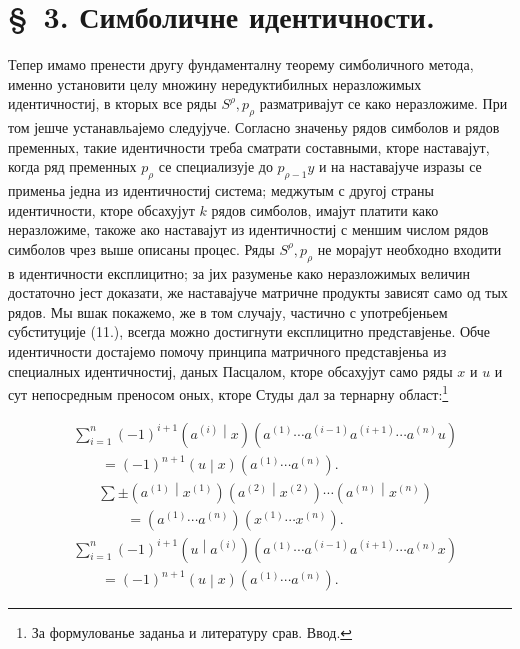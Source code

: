 \documentclass[11pt]{article}
\newcommand{\pair}[2]{\left(#1\middle|#2\right)}
\begin{document}
\section*{\S\ 3. Симболичне идентичности.}

Тепер имамо пренести другу фундаменталну теорему симболичного метода, именно установити целу множину нередуктибилных неразложимых идентичностиј, в кторых все ряды $S^\rho,p_\rho$ разматривајут се како неразложиме. При том јешче устанавльајемо следујуче. Согласно значеньу рядов симболов и рядов пременных, такие идентичности треба сматрати составными, кторе наставајут, когда ряд пременных $p_\rho$ се специализује до $p_{\rho-1}y$ и на наставајуче изразы се применьа једна из идентичностиј система; меджутым с другој страны идентичности, кторе обсахујут $k$ рядов симболов, имајут платити како неразложиме, такоже ако наставајут из идентичностиј с меншим числом рядов симболов чрез выше описаны процес. Ряды $S^\rho,p_\rho$ не морајут необходно входити в идентичности експлицитно; за јих разуменье како неразложимых величин достаточно јест доказати, же наставајуче матричне продукты зависят само од тых рядов. Мы вшак покажемо, же в том случају, частично с употребјеньем субституције (11.), всегда можно достигнути експлицитно представјенье. Обче идентичности достајемо помочу принципа матричного представјеньа из специалных идентичностиј, даных Пасцалом, кторе обсахујут само ряды $x$ и $u$ и сут непосредным преносом оных, кторе Студы дал за тернарну област:\footnote{За формулованье заданьа и литературу срав. Ввод.}

\begin{equation}
\begin{aligned}
&\sum_{i=1}^n(-1)^{i+1}\pair{a^{(i)}}{x}
(a^{(1)}\cdots a^{(i-1)}a^{(i+1)}\cdots a^{(n)}u)\\
&\qquad =(-1)^{n+1}\pair{u}{x}(a^{(1)}\cdots a^{(n)}).
\end{aligned}
\tag{13}
\end{equation}
\begin{equation}
\begin{aligned}
&\sum\pm\pair{a^{(1)}}{x^{(1)}}\pair{a^{(2)}}{x^{(2)}}\cdots
\pair{a^{(n)}}{x^{(n)}}\\
&\qquad=(a^{(1)}\cdots a^{(n)})(x^{(1)}\cdots x^{(n)}).
\end{aligned}
\tag{14}
\end{equation}
\begin{equation}
\begin{aligned}
&\sum_{i=1}^n(-1)^{i+1}\pair{u}{a^{(i)}}
(a^{(1)}\cdots a^{(i-1)}a^{(i+1)}\cdots a^{(n)}x)\\
&\qquad =(-1)^{n+1}\pair{u}{x}(a^{(1)}\cdots a^{(n)}).
\end{aligned}
\tag{15}
\end{equation}
\end{document}
